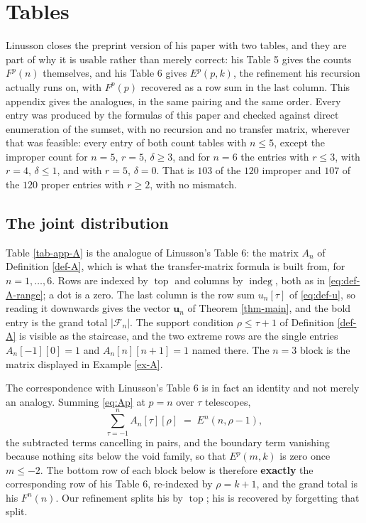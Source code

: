 \documentclass[11pt, a4paper, abstract=yes]{scrartcl}
\theoremstyle{definition}
\theoremstyle{remark}
\theoremstyle{plain}
\newcommand{\vek}[1]{\boldsymbol{#1}}
\newcommand{\indeg}{\operatorname{indeg}}
\newcommand{\tp}{\operatorname{top}}
\let\autocite\cite
\begin{document}
\section{Tables}
\label{sec-app-tables}
\label{sec:app-tables}
Linusson closes the preprint version of his paper \autocite{Linusson1999preprint} with two tables,
and they are part of why it is usable rather than
merely correct: his Table 5 gives the counts \(F^p(n)\) themselves, and his Table 6 gives
\(E^p(p,k)\),
the refinement his recursion actually runs on, with \(F^p(p)\) recovered as a row sum in the last
column. This appendix gives the analogues, in the same pairing and the same order. Every entry
was produced by the formulas of this paper and checked against direct enumeration of the
sumset, with no recursion and no transfer matrix, wherever that was feasible: every entry of both
count tables with \(n\le5\), except the improper count for \(n=5\), \(r=5\), \(\delta\ge3\), and for
\(n=6\) the entries with \(r\le3\), with \(r=4\), \(\delta\le1\), and with \(r=5\), \(\delta=0\). That is
\(103\) of the \(120\) improper and \(107\) of the \(120\) proper entries with \(r\ge2\), with no
mismatch.
\subsection{The joint distribution}
\label{sec:org646551f}

Table \ref{tab-app-A} is the analogue of Linusson's Table 6: the matrix \(A_n\) of
Definition \ref{def-A}, which is what the transfer-matrix formula is built from, for
\(n=1,\dots,6\). Rows are indexed by \(\tp\) and columns by \(\indeg\), both as in
\eqref{eq:def-A-range}; a dot is a zero. The last column is the row sum \(u_n[\tau]\) of
\eqref{eq:def-u}, so reading it downwards gives the vector \(\vek u_n\) of Theorem \ref{thm-main},
and the bold entry is the grand total \(\lvert\mathcal F_n\rvert\). The support condition
\(\rho\le\tau+1\) of Definition \ref{def-A} is visible as the staircase, and the two extreme rows
are the single entries \(A_n[-1][0]=1\) and \(A_n[n][n+1]=1\) named there. The \(n=3\) block is the
matrix displayed in Example \ref{ex-A}.

The correspondence with Linusson's Table 6 is in fact an identity and not merely an analogy.
Summing \eqref{eq:Ap} at \(p=n\) over \(\tau\) telescopes,
\begin{equation}\label{eq:colsum-is-E}
  \sum_{\tau=-1}^{n}A_n[\tau][\rho]\;=\;E^n(n,\rho-1) ,
\end{equation}
the subtracted terms cancelling in pairs, and the boundary term vanishing because nothing sits
below the void family, so that \(E^p(m,k)\) is zero once \(m\le-2\). The bottom row of each block
below is therefore \textbf{exactly} the corresponding row of his Table 6,
re-indexed by \(\rho=k+1\), and the grand total is his \(F^n(n)\). Our refinement splits his by
\(\tp\); his is recovered by forgetting that split.
\end{document}
